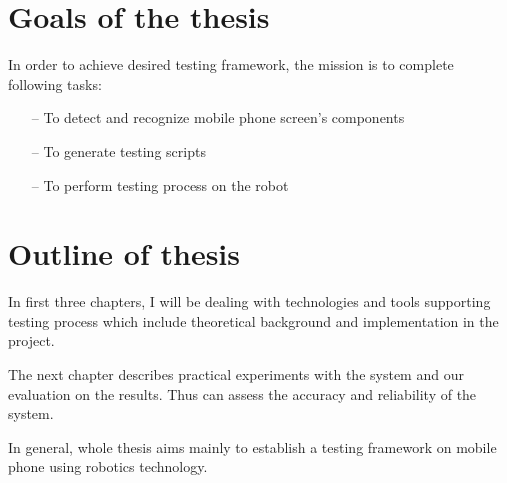 \section{Goals of the thesis}
In order to achieve desired testing framework, the mission is to complete following tasks:
	\begin{itemize}
		\item[--] To detect and recognize mobile phone screen's components
		\item[--] To generate testing scripts
		\item[--] To perform testing process on the robot
	\end{itemize}

\section{Outline of thesis}
In first three chapters, I will be dealing with technologies and tools supporting testing process which include theoretical background and implementation in the project.

The next chapter describes practical experiments with the system and our evaluation on the results. Thus can assess the accuracy and reliability of the system.

In general, whole thesis aims mainly to establish a testing framework on mobile phone using robotics technology. \nocite{radim_thesis}